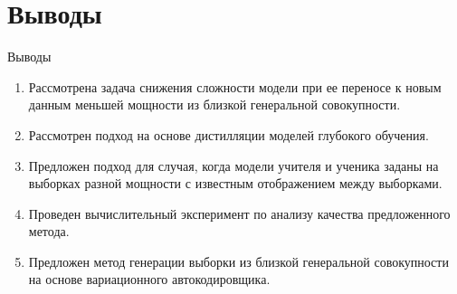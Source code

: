 \documentclass[10pt,pdf,hyperref={unicode}]{beamer}
\begin{document}
\section{Выводы}
\begin{frame}{Выводы}
\justifying
	\begin{enumerate}
	\justifying
	    \item Рассмотрена задача снижения сложности модели при ее переносе к новым данным меньшей мощности из близкой генеральной совокупности.
        \item Рассмотрен подход на основе дистилляции моделей глубокого обучения.
        \item Предложен подход для случая, когда модели учителя и ученика заданы на выборках разной мощности с известным отображением между выборками.
        \item Проведен вычислительный эксперимент по анализу качества предложенного метода.
        \item Предложен метод генерации выборки из близкой генеральной совокупности на основе вариационного автокодировщика.
	\end{enumerate}
\end{frame}
\end{document}
